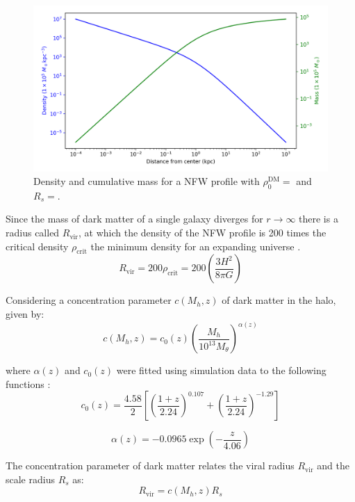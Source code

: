 		\begin{figure}[h]
			\centering
			\includegraphics[width=0.7\linewidth]{"../Files/Week 3/NFW_profile"}
			\caption{Density and cumulative mass for a NFW profile with $\rho_0^\text{DM} = $ and $R_s = $.}
		\end{figure}
		
		Since the mass of dark matter of a single galaxy diverges for $r \rightarrow \infty$ there is a radius called $R_\text{vir}$, at which the density of the NFW profile is 200 times the critical density $\rho_\text{crit}$ the minimum density for an expanding universe .
		\begin{equation}
			R_\text{vir} = 200 \rho_\text{crit} = 200 \left(\dfrac{3H^2}{8\pi G}\right)
		\end{equation}
		
		Considering a concentration parameter $c(M_h, z)$ of dark matter in the halo, given by:
		\begin{equation}
			c(M_h, z) = c_0(z)\left(\dfrac{M_h}{10^{13}M_\theta}\right)^{\alpha(z)}
		\end{equation}
		
		where $\alpha(z)$ and $c_0(z)$ were fitted using simulation data to the following functions \cite{choksi2017recoiling}:
		\begin{equation}
			c_0(z) = \dfrac{4.58}{2}\left[\left(\dfrac{1 + z}{2.24}\right)^{0.107} + \left(\dfrac{1 + z}{2.24}\right)^{-1.29}\right]
		\end{equation}
		
		\begin{equation}
			\alpha(z) = -0.0965 \exp\left(-\dfrac{z}{4.06}\right)
		\end{equation}
		
		The concentration parameter of dark matter relates the viral radius $R_\text{vir}$ and the scale radius $R_s$ as:
		\begin{equation}\label{eq: viralRadius}
			R_\text{vir} = c(M_h, z)R_s
		\end{equation}
		
